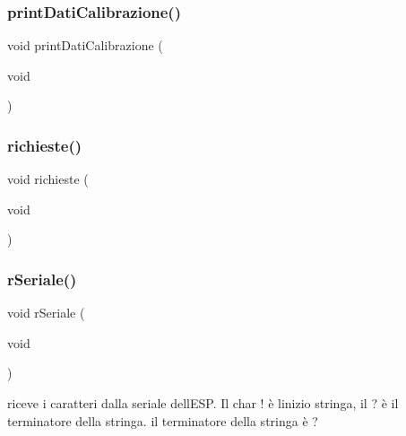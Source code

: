 \subsubsection{\texorpdfstring{print\+Dati\+Calibrazione()}{printDatiCalibrazione()}}
{\footnotesize\ttfamily void print\+Dati\+Calibrazione (\begin{DoxyParamCaption}\item[{void}]{ }\end{DoxyParamCaption})}

\mbox{\label{ari_pi__2_d_c__esp__08_8ino_a9d7193cecd4d57fda8e39dc98a236253}} 
\subsubsection{\texorpdfstring{richieste()}{richieste()}}
{\footnotesize\ttfamily void richieste (\begin{DoxyParamCaption}\item[{void}]{ }\end{DoxyParamCaption})}

\mbox{\label{ari_pi__2_d_c__esp__08_8ino_ae29b9282fc7ede860a2bb8984ad0560c}} 
\subsubsection{\texorpdfstring{r\+Seriale()}{rSeriale()}}
{\footnotesize\ttfamily void r\+Seriale (\begin{DoxyParamCaption}\item[{void}]{ }\end{DoxyParamCaption})}



riceve i caratteri dalla seriale dell\textquotesingle{}E\+SP. Il char \textquotesingle{}!\textquotesingle{} è l\textquotesingle{}inizio stringa, il \textquotesingle{}?\textquotesingle{} è il terminatore della stringa. il terminatore della stringa è ? 

